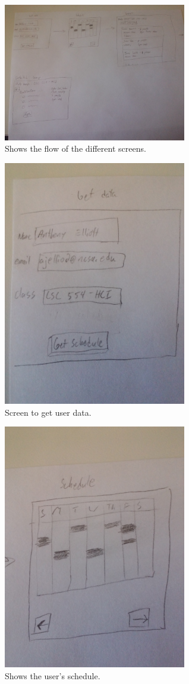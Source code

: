 \documentclass[conference]{IEEEtran}
\begin{document}
\begin{figure}[ht!]
\centering
\includegraphics[width=80mm]{figures/flow}
\caption{Shows the flow of the different screens. \label{fig:flow}}
\end{figure}

\begin{figure}[Hht!]
\centering
\includegraphics[width=80mm]{figures/getUserData}
\caption{Screen to get user data. \label{fig:userData}}
\end{figure}

\begin{figure}[ht!]
\centering
\includegraphics[width=80mm]{figures/schedule}
\caption{Shows the user's schedule. \label{fig:schedule}}
\end{figure}
\end{document}
